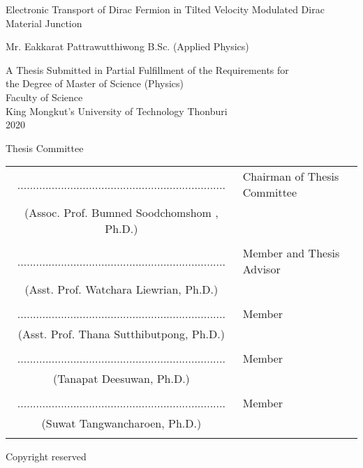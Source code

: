 \begin{center}
    Electronic Transport of Dirac Fermion in Tilted Velocity Modulated Dirac Material Junction
    \\

    \vspace{1.5cm}

    Mr. Eakkarat    Pattrawutthiwong  B.Sc. (Applied Physics) \\

    \vspace{1.5cm}

    A Thesis Submitted in Partial Fulfillment of the Requirements for\\
    the Degree of Master of Science  (Physics) \\
    Faculty of Science \\
    King Mongkut's University of Technology Thonburi \\
    2020 \\
\end{center}

    \vspace{.3cm}\noindent Thesis Committee \vspace{1cm}

\noindent \begin{tabular}{cl}

    ...................................................................&   \hspace{0.3in} Chairman of Thesis Committee \\
    \noindent(Assoc. Prof. Bumned Soodchomshom , Ph.D.)  & \\ \\

    ...................................................................&   \hspace{0.3in} Member and Thesis Advisor\\
    (Asst. Prof. Watchara Liewrian, Ph.D.)  & \\ \\

    ...................................................................&   \hspace{0.3in} Member \\
    (Asst. Prof. Thana Sutthibutpong, Ph.D.)  & \\ \\

    ...................................................................&   \hspace{0.3in} Member\\
    (Tanapat Deesuwan, Ph.D.)  & \\ \\

    ...................................................................&   \hspace{0.3in} Member \\
    (Suwat Tangwancharoen, Ph.D.)  & \\ \\

\end{tabular}

\begin{center}
    Copyright reserved
\end{center}

